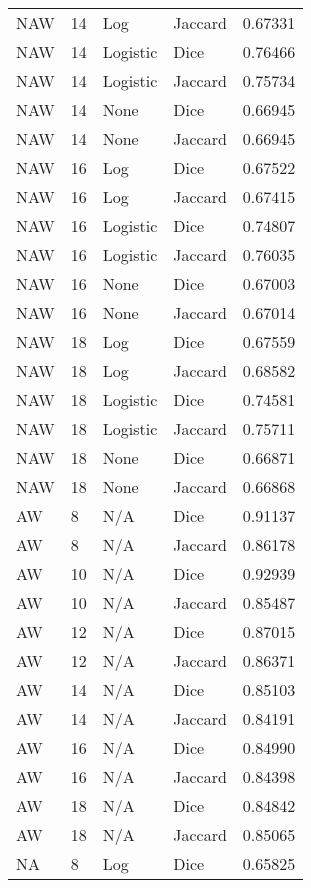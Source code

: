 \documentclass{article}
\begin{document}
\begin{center}
\begin{supertabular}{| l | l | l | l | l |}
            NAW & 14 & Log & Jaccard & 0.67331 \\
            NAW & 14 & Logistic & Dice & 0.76466 \\
            NAW & 14 & Logistic & Jaccard & 0.75734 \\
            NAW & 14 & None & Dice & 0.66945 \\
            NAW & 14 & None & Jaccard & 0.66945 \\
            NAW & 16 & Log & Dice & 0.67522 \\
            NAW & 16 & Log & Jaccard & 0.67415 \\
            NAW & 16 & Logistic & Dice & 0.74807 \\
            NAW & 16 & Logistic & Jaccard & 0.76035 \\
            NAW & 16 & None & Dice & 0.67003 \\
            NAW & 16 & None & Jaccard & 0.67014 \\
            NAW & 18 & Log & Dice & 0.67559 \\
            NAW & 18 & Log & Jaccard & 0.68582 \\
            NAW & 18 & Logistic & Dice & 0.74581 \\
            NAW & 18 & Logistic & Jaccard & 0.75711 \\
            NAW & 18 & None & Dice & 0.66871 \\
            NAW & 18 & None & Jaccard & 0.66868 \\
            AW & 8 & N/A & Dice & 0.91137 \\
            AW & 8 & N/A & Jaccard & 0.86178 \\
            AW & 10 & N/A & Dice & 0.92939 \\
            AW & 10 & N/A & Jaccard & 0.85487 \\
            AW & 12 & N/A & Dice & 0.87015 \\
            AW & 12 & N/A & Jaccard & 0.86371 \\
            AW & 14 & N/A & Dice & 0.85103 \\
            AW & 14 & N/A & Jaccard & 0.84191 \\
            AW & 16 & N/A & Dice & 0.84990 \\
            AW & 16 & N/A & Jaccard & 0.84398 \\
            AW & 18 & N/A & Dice & 0.84842 \\
            AW & 18 & N/A & Jaccard & 0.85065 \\
            NA & 8 & Log & Dice & 0.65825 \\

\end{supertabular}
\end{center}
\end{document}
